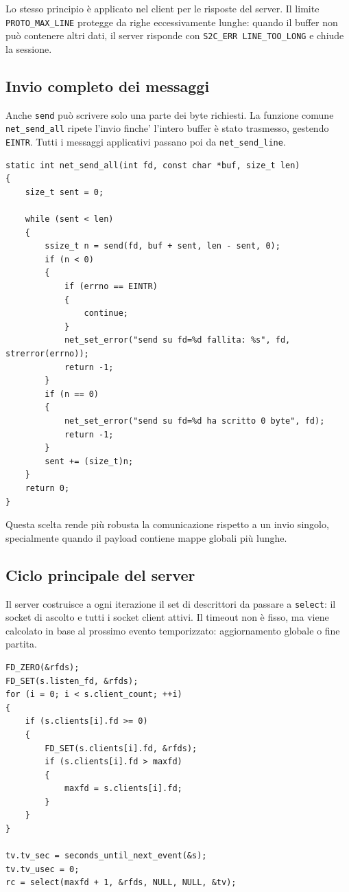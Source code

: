 \documentclass[11pt,a4paper]{article}
\begin{document}
Lo stesso principio è applicato nel client per le risposte del server. Il limite \texttt{PROTO\_MAX\_LINE} protegge da righe eccessivamente lunghe:
quando il buffer non può contenere altri dati, il server risponde con
\texttt{S2C\_ERR LINE\_TOO\_LONG} e chiude la sessione.

\subsection{Invio completo dei messaggi}

Anche \texttt{send} può scrivere solo una parte dei byte richiesti. La funzione comune \texttt{net\_send\_all} ripete l'invio finche' l'intero buffer è stato
trasmesso, gestendo \texttt{EINTR}. Tutti i messaggi applicativi passano poi da
\texttt{net\_send\_line}.

\begin{lstlisting}[style=cstyle, caption={Invio completo di una riga su socket.}]
static int net_send_all(int fd, const char *buf, size_t len)
{
    size_t sent = 0;

    while (sent < len)
    {
        ssize_t n = send(fd, buf + sent, len - sent, 0);
        if (n < 0)
        {
            if (errno == EINTR)
            {
                continue;
            }
            net_set_error("send su fd=%d fallita: %s", fd, strerror(errno));
            return -1;
        }
        if (n == 0)
        {
            net_set_error("send su fd=%d ha scritto 0 byte", fd);
            return -1;
        }
        sent += (size_t)n;
    }
    return 0;
}
\end{lstlisting}

Questa scelta rende più robusta la comunicazione rispetto a un invio singolo,
specialmente quando il payload contiene mappe globali più lunghe.

\subsection{Ciclo principale del server}

Il server costruisce a ogni iterazione il set di descrittori da passare a
\texttt{select}: il socket di ascolto e tutti i socket client attivi. Il timeout
non è fisso, ma viene calcolato in base al prossimo evento temporizzato:
aggiornamento globale o fine partita.

\begin{lstlisting}[style=cstyle, caption={Uso di select nel ciclo principale del server.}]
FD_ZERO(&rfds);
FD_SET(s.listen_fd, &rfds);
for (i = 0; i < s.client_count; ++i)
{
    if (s.clients[i].fd >= 0)
    {
        FD_SET(s.clients[i].fd, &rfds);
        if (s.clients[i].fd > maxfd)
        {
            maxfd = s.clients[i].fd;
        }
    }
}

tv.tv_sec = seconds_until_next_event(&s);
tv.tv_usec = 0;
rc = select(maxfd + 1, &rfds, NULL, NULL, &tv);
\end{lstlisting}
\end{document}
